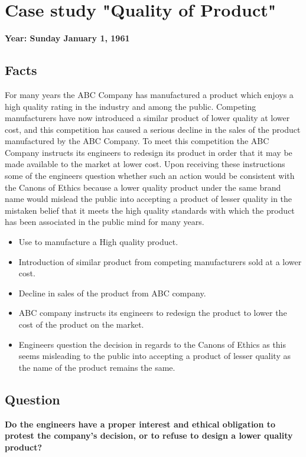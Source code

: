 \documentclass[11pt, a4paper]{article}
\begin{document}
\setcounter{page}{1}

\tableofcontents
\newpage
{}
\setcounter{page}{1}

\section{Case study "Quality of Product" }
\textbf{Year: Sunday January 1, 1961}
\subsection{Facts}
For many years the ABC Company has manufactured a product which enjoys a high quality rating in
the industry and among the public. Competing manufacturers have now introduced a similar product
of lower quality at lower cost, and this competition has caused a serious decline in the sales
of the product manufactured by the ABC Company. To meet this competition the ABC Company
instructs its engineers to redesign its product in order that it may be made available to the
market at lower cost. Upon receiving these instructions some of the engineers question whether
such an action would be consistent with the Canons of Ethics because a lower quality product
under the same brand name would mislead the public into accepting a product of lesser quality
in the mistaken belief that it meets the high quality standards with which the product has been
associated in the public mind for many years.
\begin{itemize}
  \item  Use to manufacture a High quality product.
  \item Introduction of similar product from competing manufacturers sold at a lower cost.
  \item Decline in sales of the product from ABC company.
  \item ABC company instructs its engineers to redesign the product to lower the cost of the
        product on the market. \item Engineers question the decision in regards to the Canons of Ethics as this seems
        misleading to the public into accepting a product of lesser quality as the name of the
        product remains the same.
\end{itemize}

\subsection{Question}
\textbf{Do the engineers have a proper interest and ethical obligation to protest the company's decision, or to refuse to design a lower quality product?}
\end{document}
